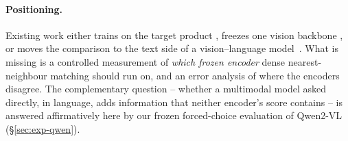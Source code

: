 \paragraph{Positioning.}
Existing work either trains on the target product
\cite{li2021cutpaste,zavrtanik2021draem,huang2022regad}, freezes one vision backbone
\cite{damm2025anomalydino,roth2022patchcore}, or moves the comparison to the text side of a
vision--language model~\cite{jeong2023winclip,zhou2024anomalyclip}. What is missing is a
controlled measurement of \emph{which frozen encoder} dense nearest-neighbour matching should
run on, and an error analysis of where the encoders disagree. The complementary question --
whether a multimodal model asked directly, in language, adds information that neither
encoder's score contains -- is answered affirmatively here by our frozen forced-choice
evaluation of Qwen2-VL (\S\ref{sec:exp-qwen}).
